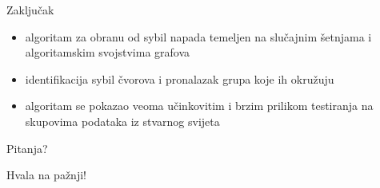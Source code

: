 \documentclass{beamer}
\begin{document}
\begin{frame}{Zaključak}
  \begin{itemize}
    \item algoritam za obranu od sybil napada temeljen na slučajnim šetnjama i algoritamskim svojstvima grafova
    \item identifikacija sybil čvorova i pronalazak grupa koje ih okružuju
    \item algoritam se pokazao veoma učinkovitim i brzim prilikom testiranja na skupovima podataka iz stvarnog svijeta
  \end{itemize}
\end{frame}

\begin{frame}[standout]
  \Huge{\centerline{Pitanja?}}
\end{frame}

\begin{frame}[standout]
  \Huge{\centerline{Hvala na pažnji!}}
\end{frame}
\end{document}
